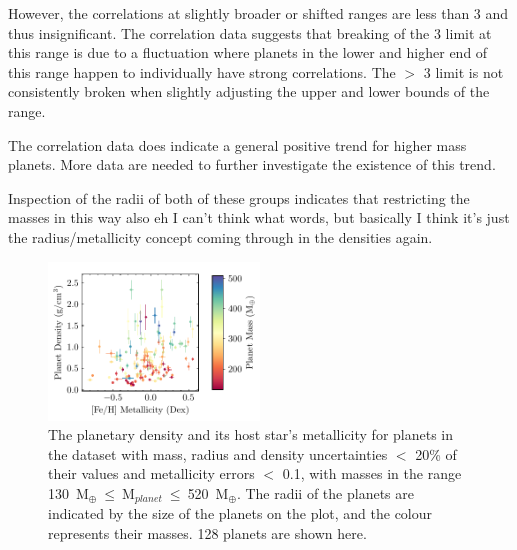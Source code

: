\documentclass[a4paper,twocolumn,12pt]{article}
\begin{document}
However, the correlations at slightly broader or shifted ranges are less than 3 and thus insignificant. The correlation data suggests that breaking of the 3 limit at this range is due to a fluctuation where planets in the lower and higher end of this range happen to individually have strong correlations. The $>$ 3 limit is not consistently broken when slightly adjusting the upper and lower bounds of the range.

The correlation data does indicate a general positive trend for higher mass planets. More data are needed to further investigate the existence of this trend.


Inspection of the radii of both of these groups indicates that restricting the masses in this way also eh I can't think what words, but basically I think it's just the radius/metallicity concept coming through in the densities again.

\begin{figure}[h!]
    \centering
    \includegraphics[width=0.5\textwidth]{Graphs/FeH vs Density Planet Plot Mass 130 to 520.pdf}
    \caption{The planetary density and its host star's metallicity for planets in the dataset with mass, radius and density uncertainties $<$ 20\% of their values and metallicity errors $<$ 0.1, with masses in the range 130~M$_{\oplus}~\leq~$M$_{planet}~\leq~$520~M$_{\oplus}$. The radii of the planets are indicated by the size of the planets on the plot, and the colour represents their masses. 128 planets are shown here.}
    \label{figure: Fe/H vs Density correlations - Mass range big boi}
\end{figure}

\end{document}
